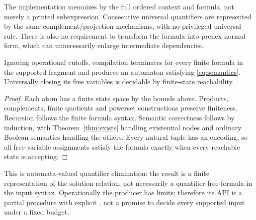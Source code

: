 The implementation memoizes by the full ordered context and formula, not merely a printed subexpression. Consecutive universal quantifiers are represented by the same complement/projection mechanisms, with no privileged universal rule. There is also no requirement to transform the formula into prenex normal form, which can unnecessarily enlarge intermediate dependencies.

\begin{theorem}\label{thm:decision}
Ignoring operational cutoffs, compilation terminates for every finite formula in the supported fragment and produces an automaton satisfying \eqref{eq:semantics}. Universally closing its free variables is decidable by finite-state reachability.
\end{theorem}
\begin{proof}
Each atom has a finite state space by the bounds above. Products, complements, finite quotients and powerset constructions preserve finiteness. Recursion follows the finite formula syntax. Semantic correctness follows by induction, with Theorem~\ref{thm:exists} handling existential nodes and ordinary Boolean semantics handling the others. Every natural tuple has an encoding, so all free-variable assignments satisfy the formula exactly when every reachable state is accepting.
\end{proof}

This is automata-valued quantifier elimination: the result is a finite representation of the solution relation, not necessarily a quantifier-free formula in the input syntax. Operationally the producer has limits; therefore its API is a partial procedure with explicit , not a promise to decide every supported input under a fixed budget.
